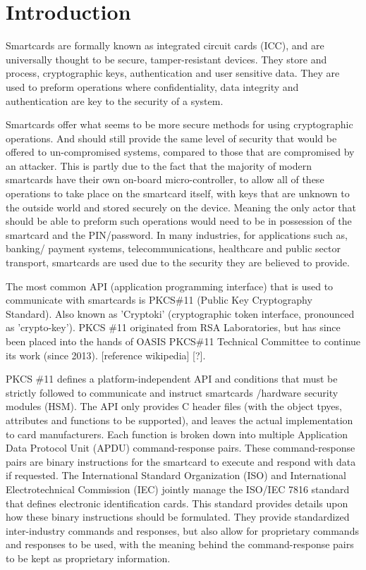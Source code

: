 \documentclass[bsc,frontabs,twoside,singlespacing,parskip,deptreport]{infthesis}     %
\begin{document}


\chapter{Introduction}
Smartcards are formally known as integrated circuit cards (ICC), and are universally thought to be secure, tamper-resistant devices. They store and process, cryptographic keys, authentication and user sensitive data. They are used to preform operations where confidentiality, data integrity and authentication are key to the security of a system.

Smartcards offer what seems to be more secure methods for using cryptographic operations. And should still provide the same level of security that would be offered to un-compromised systems, compared to those that are compromised by an attacker. This is partly due to the fact that the majority of modern smartcards have their own on-board micro-controller, to allow all of these operations to take place on the smartcard itself, with keys that are unknown to the outside world and stored securely on the device. Meaning the only actor that should be able to preform such operations would need to be in possession of the smartcard and the PIN/password. In many industries, for applications such as, banking/ payment systems, telecommunications, healthcare and public sector transport, smartcards are used due to the security they are believed to provide.

The most common API (application programming interface) that is used to communicate with smartcards is PKCS\#11 (Public Key Cryptography Standard). Also known as 'Cryptoki' (cryptographic token interface, pronounced as 'crypto-key'). PKCS \#11 originated from RSA Laboratories, but has since been placed into the hands of OASIS PKCS\#11 Technical Committee to continue its work (since 2013). [reference wikipedia] [?]. 

PKCS \#11 defines a platform-independent API and conditions that must be strictly followed to communicate and instruct smartcards /hardware security modules (HSM). The API only provides C header files (with the object tpyes, attributes and functions to be supported), and leaves the actual implementation to card manufacturers. Each function is broken down into multiple Application Data Protocol Unit (APDU) command-response pairs. These command-response pairs are binary instructions for the smartcard to execute and respond with data if requested. The International Standard Organization (ISO) and International Electrotechnical Commission (IEC) jointly manage the ISO/IEC 7816 standard that defines electronic identification cards. This standard provides details upon how these binary instructions should be formulated. They provide standardized inter-industry commands and responses, but also allow for proprietary commands and responses to be used, with the meaning behind the command-response pairs to be kept as proprietary information.
\end{document}
